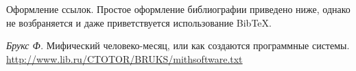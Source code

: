 
Оформление ссылок\cite{brooks}. Простое оформление библиографии
приведено ниже, однако не возбраняется и даже приветствуется
использование BibTeX.

\begin{thebibliography}{9}
 \textit{Брукс Ф.} Мифический человеко-месяц,
  или как создаются программные системы. \url{http://www.lib.ru/CTOTOR/BRUKS/mithsoftware.txt}
\end{thebibliography}


